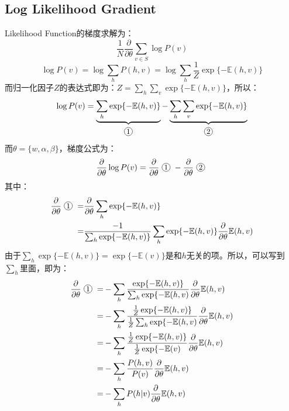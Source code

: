 \documentclass[a4paper]{article}
\newcommand*{\circled}[1]{\lower.7ex\hbox{\tikz\draw (0pt, 0pt)%
    circle (.5em) node {\makebox[1em][c]{\small #1}};}}
\begin{document}
\subsection{Log Likelihood Gradient}
Likelihood Function的梯度求解为：
\begin{equation}
   \frac{1}{N}  \frac{\partial}{\partial \theta} \sum_{v\in S} \log P(v)
\end{equation}
\begin{equation}
    \log P(v) = \log \sum_h P(h,v) = \log \sum_h \frac{1}{Z} \exp\{-\mathbb{E}(h,v)\}
\end{equation}
而归一化因子$Z$的表达式即为：$Z = \sum_h \sum_v \exp\{-\mathbb{E}(h,v)\}$，所以：
\begin{equation}
    \log P(v) = \underbrace{\sum_h \exp\{-\mathbb{E}(h,v)\}}_{\circled{1}} - \underbrace{\sum_h \sum_v \exp\{-\mathbb{E}(h,v)\}}_{\circled{2}}
\end{equation}
而$\theta = \{w,\alpha,\beta\}$，梯度公式为：
\begin{equation}
    \frac{\partial }{\partial \theta} \log P(v) = \frac{\partial }{\partial \theta} \circled{1} - \frac{\partial }{\partial \theta} \circled{2}
\end{equation}
其中：
\begin{equation}
    \begin{split}
        \frac{\partial }{\partial \theta} \circled{1} = & \frac{\partial }{\partial \theta} \sum_h \exp\{-\mathbb{E}(h,v)\} \\
        = & \frac{-1}{\sum_h \exp\{-\mathbb{E}(h,v)\}} \sum_h \exp\{-\mathbb{E}(h,v)\} \frac{\partial }{\partial \theta} \mathbb{E}(h,v)
    \end{split}
\end{equation}
由于$\sum_h \exp\{-\mathbb{E}(h,v)\} = \exp\{-\mathbb{E}(v)\}$是和$h$无关的项。所以，可以写到$\sum_h$里面，即为：
\begin{equation}
    \begin{split}
        \frac{\partial }{\partial \theta} \circled{1} = & -\sum_h \frac{\exp\{-\mathbb{E}(h,v)\}}{\sum_h \exp\{-\mathbb{E}(h,v)} \frac{\partial }{\partial \theta} \mathbb{E}(h,v) \\
        = & -\sum_h \frac{\frac{1}{Z} \exp\{-\mathbb{E}(h,v)\}}{\frac{1}{Z}\sum_h \exp\{-\mathbb{E}(h,v)} \frac{\partial }{\partial \theta} \mathbb{E}(h,v) \\
        = & -\sum_h \frac{\frac{1}{Z} \exp\{-\mathbb{E}(h,v)\}}{\frac{1}{Z} \exp\{-\mathbb{E}(v)} \frac{\partial }{\partial \theta} \mathbb{E}(h,v) \\
        = & -\sum_h \frac{P(h,v)}{P(v)} \frac{\partial }{\partial \theta} \mathbb{E}(h,v) \\
        = & -\sum_h P(h|v) \frac{\partial }{\partial \theta} \mathbb{E}(h,v) \\
    \end{split}
\end{equation}
\end{document}
